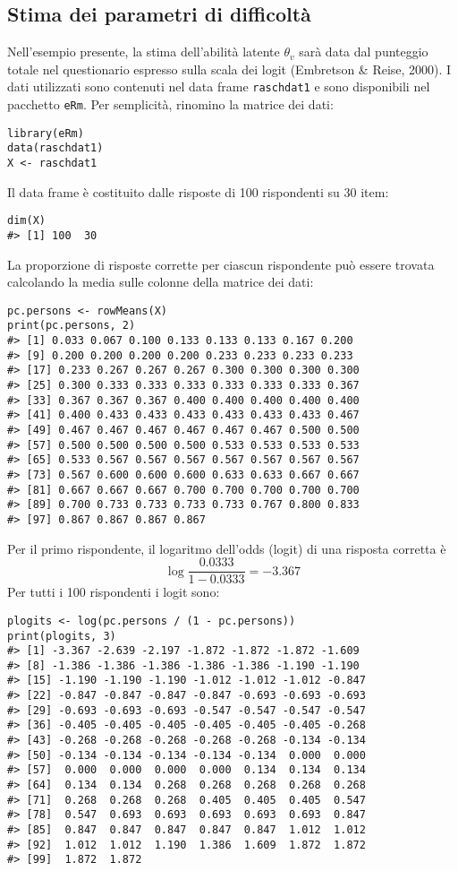 \subsection{Stima dei parametri di difficoltà}

Nell'esempio presente, la stima dell'abilità latente $\theta_v$ sarà data  dal punteggio totale nel questionario espresso sulla scala dei logit (Embretson \& Reise, 2000). I dati utilizzati sono contenuti nel data frame {\tt raschdat1} e sono disponibili nel pacchetto {\tt eRm}. Per semplicità, rinomino la matrice dei dati:
\begin{lstlisting}
library(eRm)
data(raschdat1)
X <- raschdat1
\end{lstlisting} 
Il data frame è costituito dalle risposte di 100 rispondenti su 30 item:
\begin{lstlisting}
dim(X)
#> [1] 100  30
\end{lstlisting} 
La proporzione di risposte corrette per ciascun rispondente può essere  trovata calcolando la media sulle colonne della matrice dei dati:
\begin{lstlisting}
pc.persons <- rowMeans(X)
print(pc.persons, 2)
#> [1] 0.033 0.067 0.100 0.133 0.133 0.133 0.167 0.200
#> [9] 0.200 0.200 0.200 0.200 0.233 0.233 0.233 0.233
#> [17] 0.233 0.267 0.267 0.267 0.300 0.300 0.300 0.300
#> [25] 0.300 0.333 0.333 0.333 0.333 0.333 0.333 0.367
#> [33] 0.367 0.367 0.367 0.400 0.400 0.400 0.400 0.400
#> [41] 0.400 0.433 0.433 0.433 0.433 0.433 0.433 0.467
#> [49] 0.467 0.467 0.467 0.467 0.467 0.467 0.500 0.500
#> [57] 0.500 0.500 0.500 0.500 0.533 0.533 0.533 0.533
#> [65] 0.533 0.567 0.567 0.567 0.567 0.567 0.567 0.567
#> [73] 0.567 0.600 0.600 0.600 0.633 0.633 0.667 0.667
#> [81] 0.667 0.667 0.667 0.700 0.700 0.700 0.700 0.700
#> [89] 0.700 0.733 0.733 0.733 0.733 0.767 0.800 0.833
#> [97] 0.867 0.867 0.867 0.867
\end{lstlisting} 
Per il primo rispondente, il logaritmo dell'odds (logit) di una risposta corretta è
\begin{equation*}
\log\frac{0.0333}{1 - 0.0333} = -3.367
\end{equation*}
\noindent Per tutti i 100 rispondenti i logit sono:
\begin{lstlisting}
plogits <- log(pc.persons / (1 - pc.persons))
print(plogits, 3)
#> [1] -3.367 -2.639 -2.197 -1.872 -1.872 -1.872 -1.609
#> [8] -1.386 -1.386 -1.386 -1.386 -1.386 -1.190 -1.190
#> [15] -1.190 -1.190 -1.190 -1.012 -1.012 -1.012 -0.847
#> [22] -0.847 -0.847 -0.847 -0.847 -0.693 -0.693 -0.693
#> [29] -0.693 -0.693 -0.693 -0.547 -0.547 -0.547 -0.547
#> [36] -0.405 -0.405 -0.405 -0.405 -0.405 -0.405 -0.268
#> [43] -0.268 -0.268 -0.268 -0.268 -0.268 -0.134 -0.134
#> [50] -0.134 -0.134 -0.134 -0.134 -0.134  0.000  0.000
#> [57]  0.000  0.000  0.000  0.000  0.134  0.134  0.134
#> [64]  0.134  0.134  0.268  0.268  0.268  0.268  0.268
#> [71]  0.268  0.268  0.268  0.405  0.405  0.405  0.547
#> [78]  0.547  0.693  0.693  0.693  0.693  0.693  0.847
#> [85]  0.847  0.847  0.847  0.847  0.847  1.012  1.012
#> [92]  1.012  1.012  1.190  1.386  1.609  1.872  1.872
#> [99]  1.872  1.872
\end{lstlisting} 
